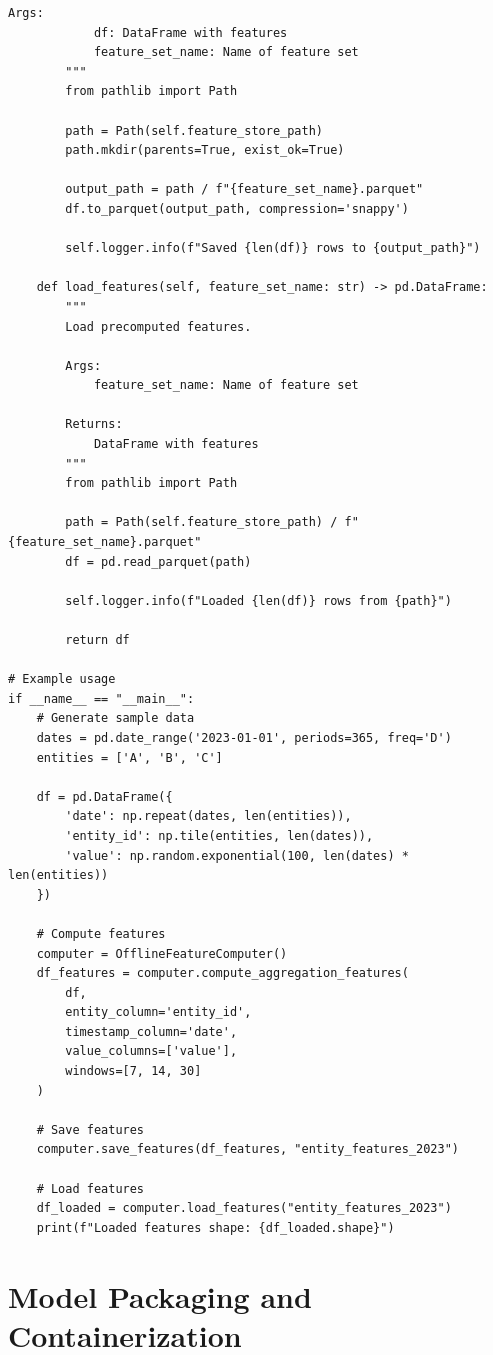 \begin{lstlisting}[style=python, caption={Offline Feature Computation for Batch Serving}]
        Args:
            df: DataFrame with features
            feature_set_name: Name of feature set
        """
        from pathlib import Path

        path = Path(self.feature_store_path)
        path.mkdir(parents=True, exist_ok=True)

        output_path = path / f"{feature_set_name}.parquet"
        df.to_parquet(output_path, compression='snappy')

        self.logger.info(f"Saved {len(df)} rows to {output_path}")

    def load_features(self, feature_set_name: str) -> pd.DataFrame:
        """
        Load precomputed features.

        Args:
            feature_set_name: Name of feature set

        Returns:
            DataFrame with features
        """
        from pathlib import Path

        path = Path(self.feature_store_path) / f"{feature_set_name}.parquet"
        df = pd.read_parquet(path)

        self.logger.info(f"Loaded {len(df)} rows from {path}")

        return df

# Example usage
if __name__ == "__main__":
    # Generate sample data
    dates = pd.date_range('2023-01-01', periods=365, freq='D')
    entities = ['A', 'B', 'C']

    df = pd.DataFrame({
        'date': np.repeat(dates, len(entities)),
        'entity_id': np.tile(entities, len(dates)),
        'value': np.random.exponential(100, len(dates) * len(entities))
    })

    # Compute features
    computer = OfflineFeatureComputer()
    df_features = computer.compute_aggregation_features(
        df,
        entity_column='entity_id',
        timestamp_column='date',
        value_columns=['value'],
        windows=[7, 14, 30]
    )

    # Save features
    computer.save_features(df_features, "entity_features_2023")

    # Load features
    df_loaded = computer.load_features("entity_features_2023")
    print(f"Loaded features shape: {df_loaded.shape}")
\end{lstlisting}

\section{Model Packaging and Containerization}

